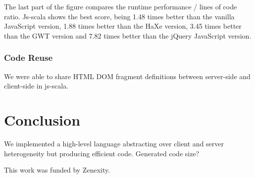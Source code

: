 \documentclass[preprint]{sigplanconf}
\begin{document}
The last part of the figure compares the runtime performance / lines of code ratio. Js-scala shows
the best score, being 1.48 times better than the vanilla JavaScript version, 1.88 times better than
the HaXe version, 3.45 times better than the GWT version and 7.82 times better than the jQuery
JavaScript version.

\subsubsection{Code Reuse}

We were able to share HTML DOM fragment definitions between server-side and client-side in js-scala.

\section{Conclusion}
\label{discussion}

We implemented a high-level language abstracting over client and server heterogeneity but producing
efficient code.
Generated code size?

%
%
\acks

This work was funded by Zenexity.



%
%
%
\end{document}
